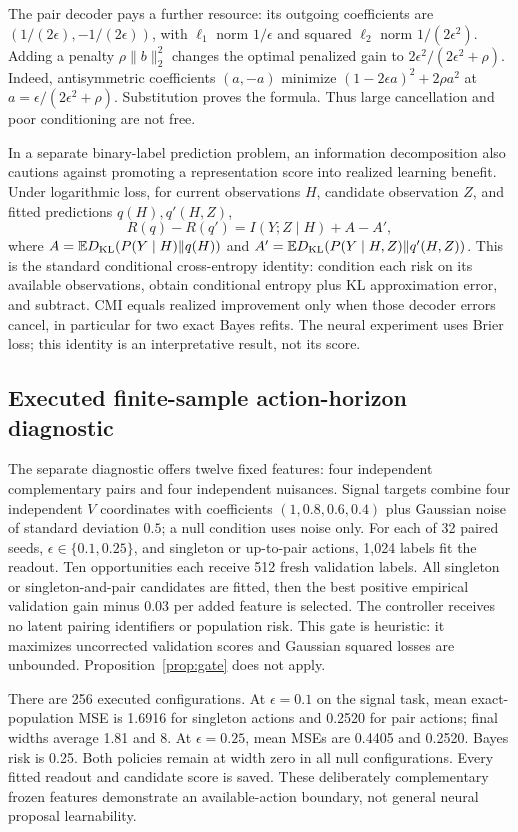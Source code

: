 The pair decoder pays a further resource: its outgoing coefficients are
$(1/(2\epsilon),-1/(2\epsilon))$, with $\ell_1$ norm $1/\epsilon$ and
squared $\ell_2$ norm $1/(2\epsilon^2)$. Adding a penalty $\rho\|b\|_2^2$
changes the optimal penalized gain to $2\epsilon^2/(2\epsilon^2+\rho)$.
Indeed, antisymmetric coefficients $(a,-a)$ minimize
$(1-2\epsilon a)^2+2\rho a^2$ at
$a=\epsilon/(2\epsilon^2+\rho)$. Substitution proves the formula.
Thus large cancellation and poor conditioning are not free.

In a separate binary-label prediction problem, an information decomposition
also cautions against promoting a representation score into realized learning
benefit. Under logarithmic
loss, for current observations $H$, candidate observation $Z$, and fitted
predictions $q(H),q'(H,Z)$,
\[
 R(q)-R(q')=I(Y;Z\mid H)+A-A',
\]
where $A=\mathbb E D_{\rm KL}(P(Y\mid H)\Vert q(H))$ and
$A'=\mathbb E D_{\rm KL}(P(Y\mid H,Z)\Vert q'(H,Z))$. This is the standard
conditional cross-entropy identity: condition each risk on its available
observations, obtain conditional entropy plus KL approximation error, and
subtract. CMI equals realized improvement only when those decoder errors
cancel, in particular for two exact Bayes refits. The neural experiment
uses Brier loss; this identity is an interpretative result, not its score.

\subsection{Executed finite-sample action-horizon diagnostic}
The separate diagnostic offers twelve fixed features: four independent
complementary pairs and four independent nuisances. Signal targets combine
four independent $V$ coordinates with coefficients $(1,0.8,0.6,0.4)$ plus
Gaussian noise of standard deviation $0.5$; a null condition uses noise only.
For each of 32 paired seeds, $\epsilon\in\{0.1,0.25\}$, and singleton or
up-to-pair actions, 1,024 labels fit the readout. Ten opportunities each
receive 512 fresh validation labels. All singleton or singleton-and-pair
candidates are fitted, then the best positive empirical validation gain
minus $0.03$ per added feature is selected. The controller receives no
latent pairing identifiers or population risk. This gate is heuristic:
it maximizes uncorrected validation scores and Gaussian squared losses are
unbounded. Proposition~\ref{prop:gate} does not apply.

There are 256 executed configurations. At $\epsilon=0.1$ on the signal
task, mean exact-population MSE is 1.6916 for singleton actions and 0.2520
for pair actions; final widths average 1.81 and 8. At $\epsilon=0.25$,
mean MSEs are 0.4405 and 0.2520. Bayes risk is 0.25. Both policies remain
at width zero in all null configurations. Every fitted readout and candidate
score is saved. These deliberately complementary frozen features demonstrate
an available-action boundary, not general neural proposal learnability.


